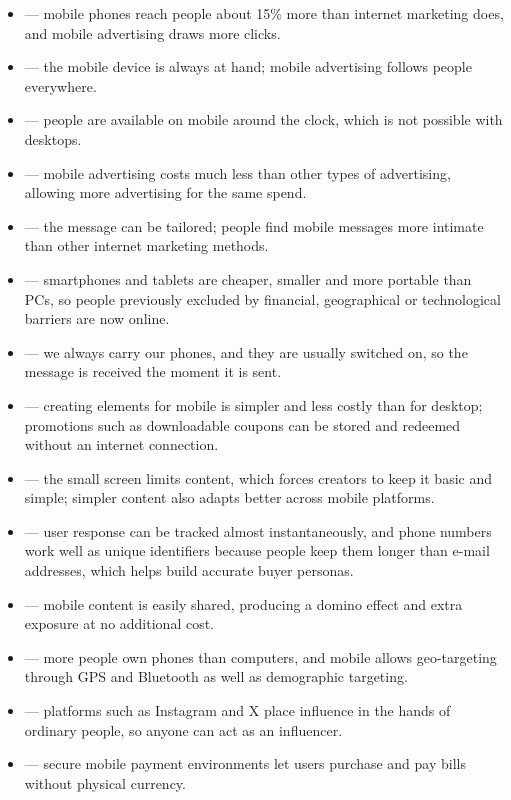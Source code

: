 \begin{itemize}
\item {} --- mobile phones reach people about 15\% more than internet
      marketing does, and mobile advertising draws more clicks.
\item {} --- the mobile device is always at hand; mobile
      advertising follows people everywhere.
\item {} --- people are available on mobile around the clock, which
      is not possible with desktops.
\item {} --- mobile advertising costs much less than other types of
      advertising, allowing more advertising for the same spend.
\item {} --- the message can be tailored; people find mobile
      messages more intimate than other internet marketing methods.
\item {} --- smartphones and tablets are cheaper,
      smaller and more portable than PCs, so people previously excluded by
      financial, geographical or technological barriers are now online.
\item {} --- we always carry our phones, and they are
      usually switched on, so the message is received the moment it is sent.
\item {} --- creating elements for mobile is simpler and less
      costly than for desktop; promotions such as downloadable coupons can be
      stored and redeemed without an internet connection.
\item {} --- the small screen limits content, which forces
      creators to keep it basic and simple; simpler content also adapts better
      across mobile platforms.
\item {} --- user response can be tracked almost
      instantaneously, and phone numbers work well as unique identifiers because
      people keep them longer than e-mail addresses, which helps build accurate
      buyer personas.
\item {} --- mobile content is easily shared, producing a
      domino effect and extra exposure at no additional cost.
\item {} --- more people own phones than
      computers, and mobile allows geo-targeting through GPS and Bluetooth as well
      as demographic targeting.
\item {} --- platforms such as Instagram and X place
      influence in the hands of ordinary people, so anyone can act as an
      influencer.
\item {} --- secure mobile payment environments let users
      purchase and pay bills without physical currency.
\end{itemize}

